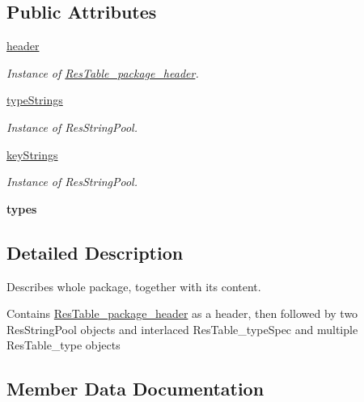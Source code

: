 \subsection*{Public Attributes}
\begin{DoxyCompactItemize}
\item 
\mbox{\hyperlink{classarsc_1_1package_1_1ResTable__package_a6a53c6e301e063885317883726cc8495}{header}}
\begin{DoxyCompactList}\small\item\em Instance of \mbox{\hyperlink{classarsc_1_1package_1_1ResTable__package__header}{Res\+Table\+\_\+package\+\_\+header}}. \end{DoxyCompactList}\item 
\mbox{\hyperlink{classarsc_1_1package_1_1ResTable__package_a8e30c278b576f2a0a8ed342fb59e5c15}{type\+Strings}}
\begin{DoxyCompactList}\small\item\em Instance of Res\+String\+Pool. \end{DoxyCompactList}\item 
\mbox{\hyperlink{classarsc_1_1package_1_1ResTable__package_a6bf9b6aa4bfc9dabb5a494c9f66a2327}{key\+Strings}}
\begin{DoxyCompactList}\small\item\em Instance of Res\+String\+Pool. \end{DoxyCompactList}\item 
\mbox{\label{classarsc_1_1package_1_1ResTable__package_a3a0444f9dc66bc57465721e0c0aecf2c}} 
{\bfseries types}
\end{DoxyCompactItemize}


\subsection{Detailed Description}
Describes whole package, together with its content. 

Contains \mbox{\hyperlink{classarsc_1_1package_1_1ResTable__package__header}{Res\+Table\+\_\+package\+\_\+header}} as a header, then followed by two Res\+String\+Pool objects and interlaced Res\+Table\+\_\+type\+Spec and multiple Res\+Table\+\_\+type objects 

\subsection{Member Data Documentation}
\mbox{\label{classarsc_1_1package_1_1ResTable__package_a6a53c6e301e063885317883726cc8495}} 

